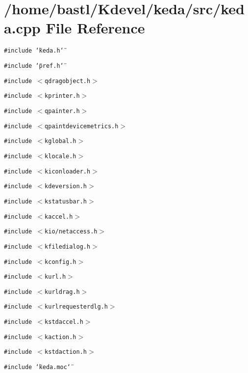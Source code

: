 \section{/home/bastl/Kdevel/keda/src/keda.cpp File Reference}
\label{keda_8cpp}
{\tt \#include \char`\"{}keda.h\char`\"{}}\par
{\tt \#include \char`\"{}pref.h\char`\"{}}\par
{\tt \#include $<$qdragobject.h$>$}\par
{\tt \#include $<$kprinter.h$>$}\par
{\tt \#include $<$qpainter.h$>$}\par
{\tt \#include $<$qpaintdevicemetrics.h$>$}\par
{\tt \#include $<$kglobal.h$>$}\par
{\tt \#include $<$klocale.h$>$}\par
{\tt \#include $<$kiconloader.h$>$}\par
{\tt \#include $<$kdeversion.h$>$}\par
{\tt \#include $<$kstatusbar.h$>$}\par
{\tt \#include $<$kaccel.h$>$}\par
{\tt \#include $<$kio/netaccess.h$>$}\par
{\tt \#include $<$kfiledialog.h$>$}\par
{\tt \#include $<$kconfig.h$>$}\par
{\tt \#include $<$kurl.h$>$}\par
{\tt \#include $<$kurldrag.h$>$}\par
{\tt \#include $<$kurlrequesterdlg.h$>$}\par
{\tt \#include $<$kstdaccel.h$>$}\par
{\tt \#include $<$kaction.h$>$}\par
{\tt \#include $<$kstdaction.h$>$}\par
{\tt \#include \char`\"{}keda.moc\char`\"{}}\par
